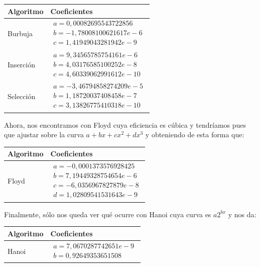 \documentclass[a4paper, 11pt]{article}
\begin{document}
\begin{center}
\begin{tabular}{ll}
Algoritmo & Coeficientes\\ \hline\noalign{\smallskip}
Burbuja  &  $\begin{array}{lll}
  a = 0,00082695543722856\\
b = -1,78008100621617e-6\\
c = 1,41949043281942e-9
\end{array}$  \\\hline\noalign{\smallskip}
  Inserción  & $\begin{array}{lll}
  a = 9,34565785754161e-6\\
b = 4,03176585100252e-8\\
c = 4,60339062991612e-10
\end{array}$\\\hline\noalign{\smallskip}
  Selección  & $\begin{array}{lll}
  a = -3,46794858274209e-5\\
b = 1,18720037408458e-7\\
c = 3,13826775410318e-10
\end{array}$\\
\end{tabular}
\end{center}

Ahora, nos encontramos con Floyd cuya eficiencia es cúbica y tendríamos pues que ajustar sobre la curva $a+bx+cx^2+dx^3$ y obteniendo de esta forma que:
\begin{center}
\begin{tabular}{ll}
Algoritmo & Coeficientes\\ \hline\noalign{\smallskip}
Floyd  & $\begin{array}{llll}
  a = -0,0001373576928425\\
b = 7,19449328754654e-6\\
c = -6,0356967827879e-8\\
d = 1,02809541531643e-9
\end{array}$\\
\end{tabular}
\end{center}

Finalmente, sólo nos queda ver qué ocurre con Hanoi cuya curva es $a2^{bx}$ y nos da:
\begin{center}
\begin{tabular}{ll}
Algoritmo & Coeficientes\\ \hline\noalign{\smallskip}
Hanoi  & $\begin{array}{ll}
  a = 7,0670287742651e-9\\
b = 0,92649353651508
\end{array}$
\end{tabular}
\end{center}
\end{document}
